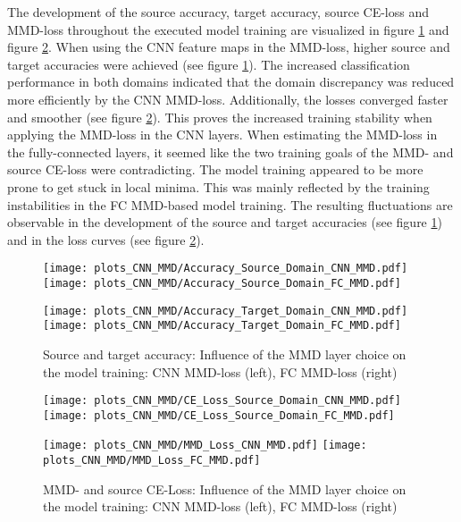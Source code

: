 The development of the source accuracy, target accuracy, source CE-loss and MMD-loss throughout the executed model training are visualized in figure \ref{fig:accuracy_cnn_and_no_cnn_mmd} and figure \ref{fig:loss_cnn_and_no_cnn_mmd}. When using the CNN feature maps in the MMD-loss, higher source and target accuracies were achieved (see figure \ref{fig:accuracy_cnn_and_no_cnn_mmd}). The increased classification performance in both domains indicated that the domain discrepancy was reduced more efficiently by the CNN MMD-loss. Additionally, the losses converged faster and smoother (see figure \ref{fig:loss_cnn_and_no_cnn_mmd}). This proves the increased training stability when applying the MMD-loss in the CNN layers. When estimating the MMD-loss in the fully-connected layers, it seemed like the two training goals of the MMD- and source CE-loss were contradicting. The model training appeared to be more prone to get stuck in local minima. This was mainly reflected by the training instabilities in the FC MMD-based model training. The resulting fluctuations are observable in the development of the source and target accuracies (see figure \ref{fig:accuracy_cnn_and_no_cnn_mmd}) and in the loss curves (see figure \ref{fig:loss_cnn_and_no_cnn_mmd}).
\newline
\begin{figure}[htp]
  \centering
  \texttt{[image: plots\_CNN\_MMD/Accuracy\_Source\_Domain\_CNN\_MMD.pdf]}
  \hspace{.3cm}
  \texttt{[image: plots\_CNN\_MMD/Accuracy\_Source\_Domain\_FC\_MMD.pdf]}

  \vspace{.1cm}

  \texttt{[image: plots\_CNN\_MMD/Accuracy\_Target\_Domain\_CNN\_MMD.pdf]}
  \hspace{.3cm}
  \texttt{[image: plots\_CNN\_MMD/Accuracy\_Target\_Domain\_FC\_MMD.pdf]}

  \caption{Source and target accuracy: Influence of the MMD layer choice on the model training: CNN MMD-loss (left), FC MMD-loss (right)}
  \label{fig:accuracy_cnn_and_no_cnn_mmd}
\end{figure}

\begin{figure}[H]
  \centering
  \texttt{[image: plots\_CNN\_MMD/CE\_Loss\_Source\_Domain\_CNN\_MMD.pdf]}
  \hspace{.3cm}
  \texttt{[image: plots\_CNN\_MMD/CE\_Loss\_Source\_Domain\_FC\_MMD.pdf]}

  \vspace{.1cm}

  \texttt{[image: plots\_CNN\_MMD/MMD\_Loss\_CNN\_MMD.pdf]}
  \hspace{.1cm}
  \texttt{[image: plots\_CNN\_MMD/MMD\_Loss\_FC\_MMD.pdf]}

  \caption{MMD- and source CE-Loss: Influence of the MMD layer choice on the model training: CNN MMD-loss (left), FC MMD-loss (right)}
  \label{fig:loss_cnn_and_no_cnn_mmd}
\end{figure}

